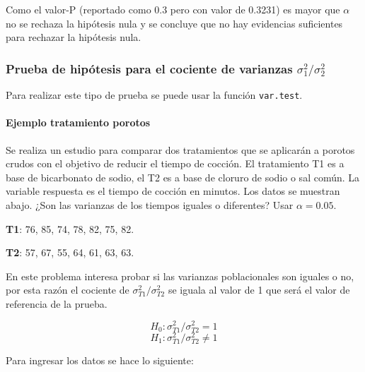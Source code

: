 \documentclass[
]{article}
\begin{document}
Como el valor-P (reportado como 0.3 pero con valor de 0.3231) es mayor
que \(\alpha\) no se rechaza la hipótesis nula y se concluye que no hay
evidencias suficientes para rechazar la hipótesis nula.

\hypertarget{prueba-de-hipuxf3tesis-para-el-cociente-de-varianzas-sigma_12-sigma_22}{%
\subsubsection{\texorpdfstring{Prueba de hipótesis para el cociente de
varianzas
\(\sigma_1^2 / \sigma_2^2\)}{Prueba de hipótesis para el cociente de varianzas \textbackslash sigma\_1\^{}2 / \textbackslash sigma\_2\^{}2}}\label{prueba-de-hipuxf3tesis-para-el-cociente-de-varianzas-sigma_12-sigma_22}}

Para realizar este tipo de prueba se puede usar la función
\texttt{var.test}.

\hypertarget{ejemplo-tratamiento-porotos}{%
\paragraph{Ejemplo tratamiento
porotos}\label{ejemplo-tratamiento-porotos}}

Se realiza un estudio para comparar dos tratamientos que se aplicarán a
porotos crudos con el objetivo de reducir el tiempo de cocción. El
tratamiento T1 es a base de bicarbonato de sodio, el T2 es a base de
cloruro de sodio o sal común. La variable respuesta es el tiempo de
cocción en minutos. Los datos se muestran abajo. ¿Son las varianzas de
los tiempos iguales o diferentes? Usar \(\alpha=0.05\).

\textbf{T1}: 76, 85, 74, 78, 82, 75, 82.

\textbf{T2}: 57, 67, 55, 64, 61, 63, 63.

En este problema interesa probar si las varianzas poblacionales son
iguales o no, por esta razón el cociente de
\(\sigma_{T1}^2 / \sigma_{T2}^2\) se iguala al valor de 1 que será el
valor de referencia de la prueba.

\[H_0: \sigma_{T1}^2 / \sigma_{T2}^2 = 1\]
\[H_1: \sigma_{T1}^2 / \sigma_{T2}^2 \neq 1\]

Para ingresar los datos se hace lo siguiente:
\end{document}

